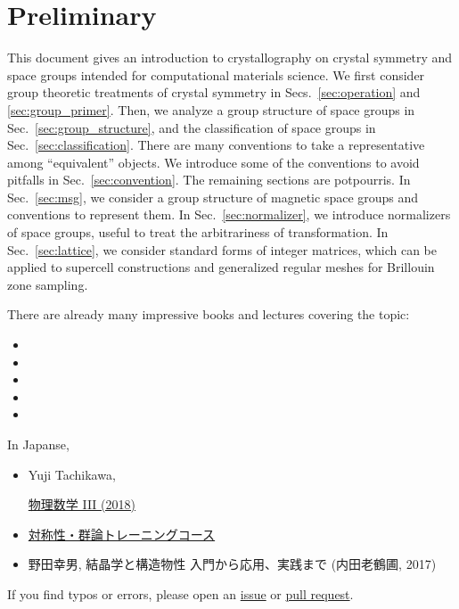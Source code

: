 \section{\label{sec:preliminary}Preliminary}

This document gives an introduction to crystallography on crystal symmetry and space groups intended for computational materials science.
We first consider group theoretic treatments of crystal symmetry in Secs.~\ref{sec:operation} and \ref{sec:group_primer}.
Then, we analyze a group structure of space groups in Sec.~\ref{sec:group_structure}, and the classification of space groups in Sec.~\ref{sec:classification}.
There are many conventions to take a representative among ``equivalent'' objects.
We introduce some of the conventions to avoid pitfalls in Sec.~\ref{sec:convention}.
The remaining sections are potpourris.
In Sec.~\ref{sec:msg}, we consider a group structure of magnetic space groups and conventions to represent them.
In Sec.~\ref{sec:normalizer}, we introduce normalizers of space groups, useful to treat the arbitrariness of transformation.
In Sec.~\ref{sec:lattice}, we consider standard forms of integer matrices, which can be applied to supercell constructions and generalized regular meshes for Brillouin zone sampling.

There are already many impressive books and lectures covering the topic:
\begin{itemize}
    \item {}
    \item {}
    \item {}
    \item {}
    \item {}
\end{itemize}

In Japanse,
\begin{itemize}
    \item Yuji Tachikawa, \begin{CJK}{UTF8}{ipxm}\href{https://member.ipmu.jp/yuji.tachikawa/lectures/2018-butsurisuugaku3/}{物理数学 III (2018)}\end{CJK}
    \item \begin{CJK}{UTF8}{ipxm}\href{http://pfwww.kek.jp/trainingcourse/bunken.html}{対称性・群論トレーニングコース}\end{CJK}
    \item \begin{CJK}{UTF8}{ipxm}野田幸男, 結晶学と構造物性 入門から応用、実践まで (内田老鶴圃, 2017)\end{CJK}
\end{itemize}

If you find typos or errors, please open an \href{https://github.com/lan496/crystal-symmetry-primer/issues?q=is%3Aissue+is%3Aopen+sort%3Aupdated-desc}{issue} or \href{https://github.com/lan496/crystal-symmetry-primer/pulls?q=is%3Apr+is%3Aopen+sort%3Aupdated-desc}{pull request}.
